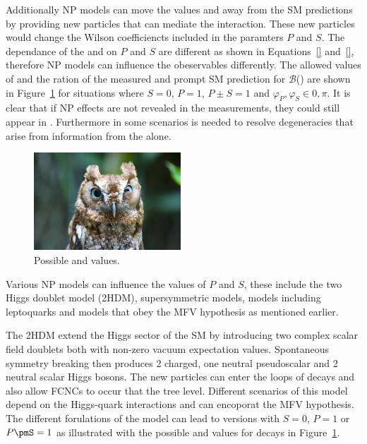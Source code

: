 Additionally NP models can move the \BF values and \ADG away from the SM predictions by providing new particles that can mediate the interaction. These new particles would change the Wilson coefficiencts included in the paramters $P$ and $S$. The dependance of the \BFs and \ADG on $P$ and $S$ are different as shown in Equations~\ref{} and~\ref{}, therefore NP models can influence the obeservables differently. The allowed values of \ADG and the ration of the measured and prompt SM prediction for $\mathcal{B}$(\bsmumu) are shown in Figure~\ref{fig:NPmodels} for situations where $S=0$, $P=1$, $P\pm S = 1$ and $\varphi_P, \varphi_S \in {0, \pi}$. It is clear that if NP effects are not revealed in the \BF measurements, they could still appear in \ADG. Furthermore in some scenarios \ADG is needed to resolve degeneracies that arise from information from the \BF alone.
\begin{figure}[htbp]
    \centering
        \includegraphics[width=0.49\textwidth]{./Figs/placeholder.jpeg}
    \caption{Possible \BF and \ADG values.}
    \label{fig:NPmodels}
\end{figure}
Various NP models can influence the values of $P$ and $S$, these include the two Higgs doublet model (2HDM), supersymmetric models, models including leptoquarks and models that obey the MFV hypothesis as mentioned earlier.

The 2HDM extend the Higgs sector of the SM by introducing two complex scalar field doublets both with non-zero vacuum expectation values. Spontaneous symmetry breaking then produces 2 charged, one neutral pseudoscalar and 2 neutral scalar Higgs bosons. The new particles can enter the loops of \bmumu decays and also allow FCNCs to occur that the tree level. Different scenarios of this model depend on the Higgs-quark interactions and can encoporat the MFV hypothesis. The different forulations of the model can lead to versions with $S=0$, $P=1$ or $P\pmS = 1$ as illustrated with the possible \BF and \ADG values for \bsmumu decays in Figure~\ref{fig:NPmodels}.

